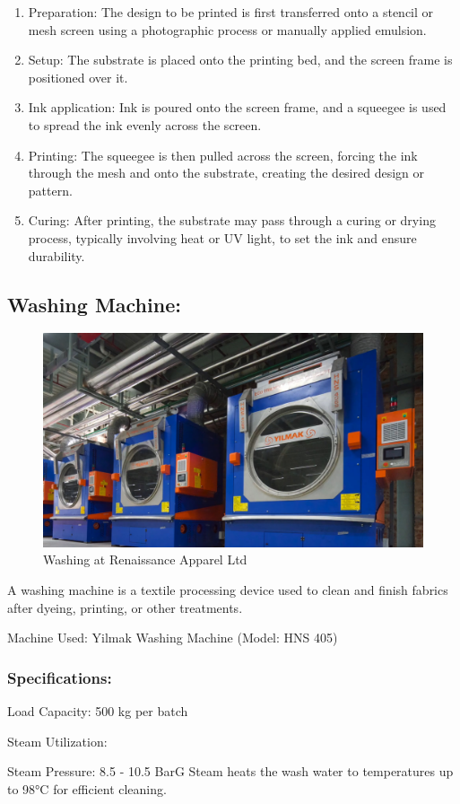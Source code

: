 \begin{enumerate}
\item
  Preparation: The design to be printed is first transferred onto a
  stencil or mesh screen using a photographic process or manually
  applied emulsion.
\item
  Setup: The substrate is placed onto the printing bed, and the screen
  frame is positioned over it.
\item
  Ink application: Ink is poured onto the screen frame, and a squeegee
  is used to spread the ink evenly across the screen.
\item
  Printing: The squeegee is then pulled across the screen, forcing the
  ink through the mesh and onto the substrate, creating the desired
  design or pattern.
\item
  Curing: After printing, the substrate may pass through a curing or
  drying process, typically involving heat or UV light, to set the ink
  and ensure durability.
\end{enumerate}


\subsection{Washing Machine:}
\begin{figure}[h!]
  \centering
  \includegraphics[width=0.8\linewidth]{figs/washing.jpg}
  \caption{Washing at Renaissance Apparel Ltd}
  \label{fig:washing}
\end{figure}

A washing machine is a textile processing device used to clean and finish fabrics after dyeing, printing, or other treatments.

Machine Used: Yilmak Washing Machine (Model: HNS 405)

\subsubsection{Specifications:}
Load Capacity: 500 kg per batch

Steam Utilization:

Steam Pressure: 8.5 - 10.5 BarG
Steam heats the wash water to temperatures up to 98°C for efficient cleaning.
